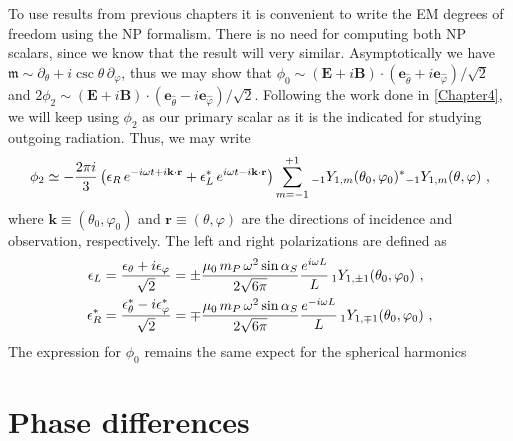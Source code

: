 To use results from previous chapters it is convenient to write the EM degrees of freedom using the NP formalism.
There is no need for computing both NP scalars, since we know that the result will very similar.
Asymptotically we have $\mathfrak{m}\sim \partial_\theta + i \csc\theta \,\partial_\varphi$, thus we may show that $\phi_0 \sim (\mathbf{E} + i \mathbf{B}) \cdot (\mathbf{e}_{\hat{\theta}} + i \mathbf{e}_{\hat{\varphi}} )/\sqrt{2}$ and $2\phi_2 \sim (\mathbf{E} + i \mathbf{B}) \cdot (\mathbf{e}_{\hat{\theta}} - i \mathbf{e}_{\hat{\varphi}} )/\sqrt{2}$.
Following the work done in \cref{Chapter4}, we will keep using $\phi_2$ as our primary scalar as it is the indicated for studying outgoing radiation.
Thus, we may write
\begin{align}
    \phi_2 \simeq - \frac{2 \pi i }{3} \left( \epsilon_R \,e^{-i \omega t + i \mathbf{k}\cdot\mathbf{r}} + \epsilon_L^* \,e^{i \omega t - i \mathbf{k}\cdot\mathbf{r}} \right) \sum_{m=-1}^{+1} \uu[-1]{Y}{1,m}(\theta_0,\varphi_0)^{*} \uu[-1]{Y}{1,m}(\theta,\varphi) ~,
\end{align}
where $\mathbf{k}\equiv(\theta_0,\varphi_0)$ and $\mathbf{r}\equiv(\theta,\varphi)$ are the directions of incidence and observation, respectively. The left and right polarizations are defined as
\begin{align}
    \begin{split}
        \epsilon_L &= \frac{\epsilon_{\theta} + i \epsilon_{\varphi}}{\sqrt{2}}
        = \pm \frac{\mu_0 \,m_P \,\omega^2 \sin\alpha_S}{2\sqrt{6\pi}} 
        \frac{e^{i\omega L}}{L} \,\uu[1]{Y}{1,\pm 1}(\theta_0,\varphi_0) ~, \\
        \epsilon_R^* &= \frac{\epsilon_{\theta}^* - i \epsilon_{\varphi}^*}{\sqrt{2}} =
        \mp \frac{\mu_0 \,m_P \,\omega^2 \sin\alpha_S}{2\sqrt{6\pi}}
        \frac{e^{-i\omega L}}{L} \,\uu[1]{Y}{1,\mp 1}(\theta_0,\varphi_0) ~,
    \end{split}
\end{align}
The expression for $\phi_0$ remains the same expect for the spherical harmonics 





\section{Phase differences}



\cleardoublepage